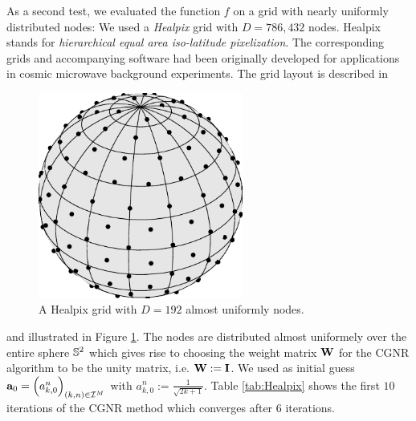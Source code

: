 \begin{example}
    As a second test, we evaluated the function $f$ on a grid with nearly uniformly distributed
    nodes: We used a \emph{Healpix} grid with $D=786,432$ nodes. Healpix stands for 
    \emph{hierarchical equal area iso-latitude pixelization}. The corresponding grids 
    and accompanying software had been originally developed for applications in 
    cosmic microwave background experiments. The grid layout is described in  
    \begin{figure}[tb]
      \centering
      \includegraphics[width=0.6\textwidth]{images/healpix}
      \caption{A Healpix grid with $D = 192$ almost uniformly nodes.}
      \label{Applications:healpix}
    \end{figure}  
    \cite{healpix} and illustrated in Figure \ref{Applications:healpix}. The nodes are distributed 
    almost uniformely over the entire sphere $\mathbb{S}^2$ which gives rise to choosing the weight matrix 
    $\mathbf{W}$ for the CGNR algorithm to be the unity matrix, i.e. $\mathbf{W} := \mathbf{I}$. We used as 
    initial guess $\mathbf{a}_{0} = \left(a_{k,0}^n\right)_{(k,n) \in \mathcal{I}^M}$ with $a_{k,0}^n := 
    \frac{1}{\sqrt{2k+1}}$. Table \ref{tab:Healpix} shows the first $10$ iterations of the CGNR method which 
    converges after 6 iterations.    
    

\end{example}
